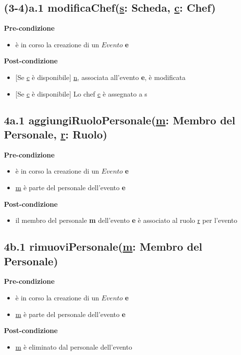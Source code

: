 \documentclass[12pt]{extarticle}
\begin{document}
\subsection*{(3-4)a.1 modificaChef(\underline{s}: Scheda, \underline{c}: Chef)}
\textbf{Pre-condizione}
\begin{itemize}
  \item è in corso la creazione di un $Evento$ \textbf{e}
\end{itemize} 
\textbf{Post-condizione}
\begin{itemize}
  \item $[$Se \underline{c}  è disponibile$]$ \underline{n}, associata all'evento \textbf{e}, è modificata
  \item $[$Se \underline{c}  è disponibile$]$ Lo chef \underline{c}  è assegnato a s
\end{itemize}


\subsection*{4a.1 aggiungiRuoloPersonale(\underline{m}: Membro del Personale, \underline{r}: Ruolo)}
\textbf{Pre-condizione}
\begin{itemize}
  \item è in corso la creazione di un $Evento$ \textbf{e}
  \item \underline{m} è parte del personale dell'evento \textbf{e}
\end{itemize}
\textbf{Post-condizione}
\begin{itemize}
  \item il membro del personale \textbf{m} dell'evento \textbf{e} è associato al ruolo \underline{r} per l'evento
\end{itemize}


\subsection*{4b.1 rimuoviPersonale(\underline{m}: Membro del Personale)}
\textbf{Pre-condizione}
\begin{itemize}
  \item è in corso la creazione di un $Evento$ \textbf{e}
  \item \underline{m} è parte del personale dell'evento \textbf{e}
\end{itemize}
\textbf{Post-condizione}
\begin{itemize}
  \item \underline{m} è eliminato dal personale dell'evento
\end{itemize}
\end{document}
